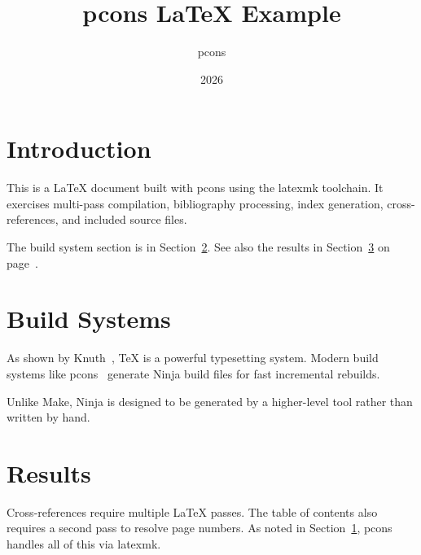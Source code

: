 \documentclass{article}
\title{pcons \LaTeX{} Example}
\author{pcons}
\date{2026}
\begin{document}
\maketitle
\tableofcontents

\section{Introduction}
\label{sec:intro}

This is a \LaTeX{} document built with pcons using the latexmk toolchain.
It exercises multi-pass compilation, bibliography processing, index generation,
cross-references, and included source files.

The build system section is in Section~\ref{sec:buildsys}.
See also the results in Section~\ref{sec:results} on page~\pageref{sec:results}.

\section{Build Systems}
\label{sec:buildsys}

As shown by Knuth~\cite{knuth1984}, \TeX{} is a powerful typesetting system.
Modern build systems like pcons~\cite{pcons2026}
generate Ninja build files for fast incremental rebuilds.

Unlike Make, Ninja is designed to be generated by a
higher-level tool rather than written by hand.



\section{Results}
\label{sec:results}

Cross-references require multiple \LaTeX{} passes.
The table of contents also requires a second pass
to resolve page numbers.  As noted in Section~\ref{sec:intro}, pcons handles
all of this via latexmk.




\printindex
\end{document}
